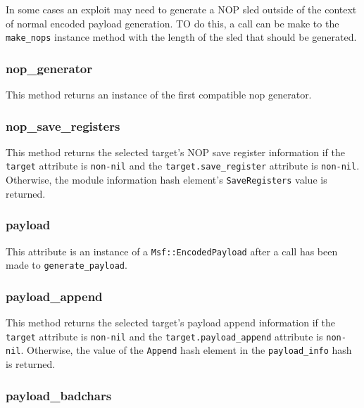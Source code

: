 \documentclass{report}
\begin{document}
\par
In some cases an exploit may need to generate a NOP sled outside of
the context of normal encoded payload generation.  TO do this, a
call can be make to the \texttt{make\_nops} instance method with the
length of the sled that should be generated.

            \subsubsection{nop\_generator}

\par
This method returns an instance of the first compatible nop
generator.

            \subsubsection{nop\_save\_registers}

\par
This method returns the selected target's NOP save register
information if the \texttt{target} attribute is \texttt{non-nil} and
the \texttt{target.save\_register} attribute is \texttt{non-nil}.
Otherwise, the module information hash element's
\texttt{SaveRegisters} value is returned.

            \subsubsection{payload}

\par
This attribute is an instance of a \texttt{Msf::EncodedPayload}
after a call has been made to \texttt{generate\_payload}.

            \subsubsection{payload\_append}

\par
This method returns the selected target's payload append information
if the \texttt{target} attribute is \texttt{non-nil} and the
\texttt{target.payload\_append} attribute is \texttt{non-nil}.
Otherwise, the value of the \texttt{Append} hash element in the
\texttt{payload\_info} hash is returned.

            \subsubsection{payload\_badchars}
\end{document}
